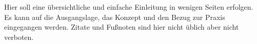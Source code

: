 Hier soll eine übersichtliche und einfache Einleitung in wenigen Seiten erfolgen. 
Es kann auf die Ausgangslage, das Konzept und den Bezug zur Praxis eingegangen werden. 
Zitate und Fußnoten sind hier nicht üblich aber nicht verboten.